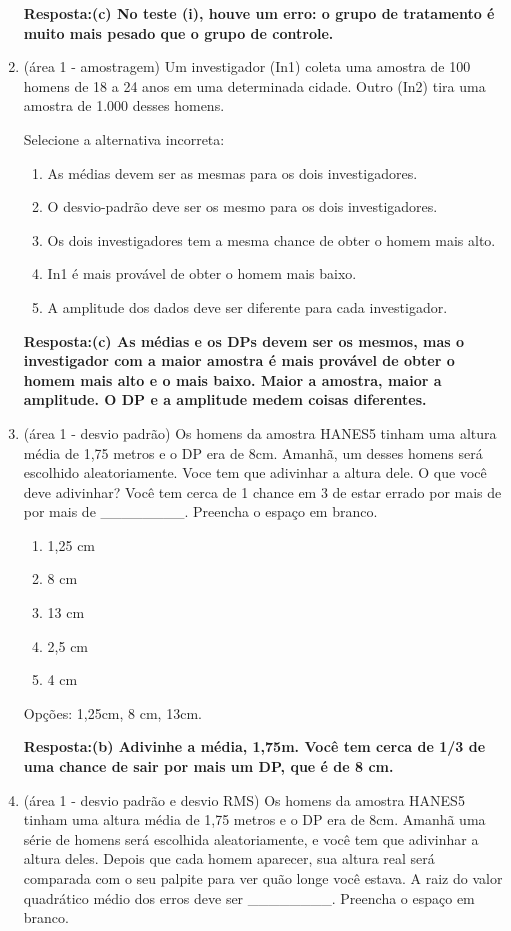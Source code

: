 \documentclass[12pt]{article}\documentclass[brazilian,12pt,a4paper,final]{article}
\begin{document}
\begin{enumerate}
\textbf{Resposta:(c) No teste (i), houve um erro: o grupo de tratamento é muito mais pesado que o
grupo de controle.}

\item (área 1 - amostragem) Um investigador (In1) coleta uma amostra de 100 homens de 18 a 24 anos em uma determinada cidade. Outro (In2)
tira uma amostra de 1.000 desses homens.

Selecione a alternativa incorreta:
\begin{enumerate}
    \item As médias devem ser as mesmas para os dois investigadores.
    \item O desvio-padrão deve ser os mesmo para os dois investigadores.
    \item Os dois investigadores tem a mesma chance de obter o homem mais alto.
    \item In1 é mais provável de obter o homem mais baixo.
    \item A amplitude dos dados deve ser diferente para cada  investigador.
\end{enumerate}

\textbf{Resposta:(c) As médias e os DPs devem ser os mesmos, mas o investigador com a maior amostra é mais provável de obter o homem mais alto e o mais baixo. Maior
a amostra, maior a amplitude. O DP e a amplitude medem coisas diferentes.}

\item (área 1 - desvio padrão)  Os homens da amostra HANES5 tinham uma altura média de 1,75 metros e o DP
era de 8cm. Amanhã, um desses homens será escolhido aleatoriamente. Voce tem que
adivinhar a altura dele. O que você deve adivinhar? Você tem cerca de 1 chance em 3 de estar errado por mais de 
por mais de \_\_\_\_\_\_\_\_. Preencha o espaço em branco.

\begin{enumerate}
    \item 1,25 cm
    \item 8 cm
    \item 13 cm
    \item 2,5 cm
    \item 4 cm
\end{enumerate}

Opções: 1,25cm, 8 cm, 13cm.

\textbf{Resposta:(b) Adivinhe a média, 1,75m. Você tem cerca de 1/3 de uma chance de sair por mais
um DP, que é de 8 cm.}

\item (área 1 - desvio padrão e desvio RMS) Os homens da amostra HANES5 tinham uma altura média de 1,75 metros e o DP
era de 8cm. Amanhã uma série de homens será escolhida aleatoriamente, e você tem que adivinhar a altura deles.
Depois que cada homem aparecer, sua altura real será comparada com o seu palpite para
ver quão longe você estava. A raiz do valor quadrático médio dos erros deve ser \_\_\_\_\_\_\_\_. Preencha o espaço em branco.


\end{enumerate}
\end{document}
